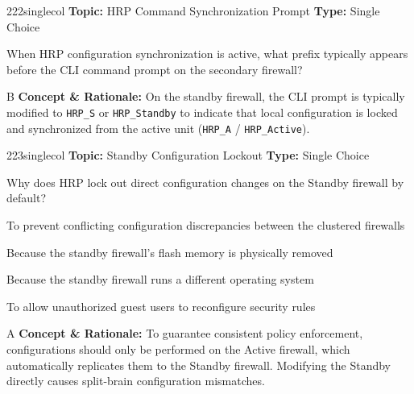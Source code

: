 \begin{qcard}{222}{singlecol}
\textcolor{darkslate!75}{\small\textbf{Topic:} HRP Command Synchronization Prompt \hfill \textbf{Type:} Single Choice}\vspace{0.4em}\par
When HRP configuration synchronization is active, what prefix typically appears before the CLI command prompt on the secondary firewall?
\begin{qoptions}
\item [HRP\_Active]
\item [HRP\_Standby]
\item [Master\_Node]
\item [Sync\_Disabled]
\end{qoptions}
\end{qcard}
\nopagebreak
\begin{explainbox}{B}
\textbf{Concept \& Rationale:} On the standby firewall, the CLI prompt is typically modified to \texttt{HRP\_S} or \texttt{HRP\_Standby} to indicate that local configuration is locked and synchronized from the active unit (\texttt{HRP\_A} / \texttt{HRP\_Active}).
\end{explainbox}

\begin{qcard}{223}{singlecol}
\textcolor{darkslate!75}{\small\textbf{Topic:} Standby Configuration Lockout \hfill \textbf{Type:} Single Choice}\vspace{0.4em}\par
Why does HRP lock out direct configuration changes on the Standby firewall by default?
\begin{qoptions}
\item To prevent conflicting configuration discrepancies between the clustered firewalls
\item Because the standby firewall's flash memory is physically removed
\item Because the standby firewall runs a different operating system
\item To allow unauthorized guest users to reconfigure security rules
\end{qoptions}
\end{qcard}
\nopagebreak
\begin{explainbox}{A}
\textbf{Concept \& Rationale:} To guarantee consistent policy enforcement, configurations should only be performed on the Active firewall, which automatically replicates them to the Standby firewall. Modifying the Standby directly causes split-brain configuration mismatches.
\end{explainbox}

